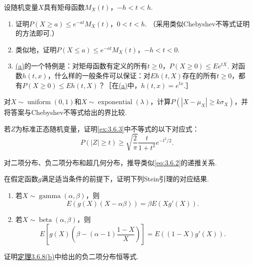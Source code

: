 \begin{exercise}\label{exercise:3.45}
设随机变量$X$具有矩母函数$M_X(t)$，$-h<t<h$.
\begin{enumerate}
\item[(a)]\label{itm:exercise:3.45:a} 证明$P(X\ge a)\le e^{-at}M_X(t)$，$0<t<h$. （采用类似Chebyshev不等式证明的方法即可.）
\item[(b)] 类似地，证明$P(X\le a)\le e^{-at}M_X(t)$，$-h<t<0$.
\item[(c)] \hyperref[itm:exercise:3.45:a]{(a)}的一个特例是：对矩母函数有定义的所有$t\ge0$，$P(X\ge0)\le Ee^{tX}$. 对函数$h(t,x)$，什么样的一般条件可以保证：对$Eh(t,X)$存在的所有$t\ge0$，都有$P(X\ge0)\le Eh(t,X)$？［在\hyperref[itm:exercise:3.45:a]{(a)}中，$h(t,x)=e^{tx}$.］
\end{enumerate}
\end{exercise}
\begin{exercise}\label{exercise:3.46}
对$X\sim\operatorname{uniform}(0,1)$和$X\sim\operatorname{exponential}(\lambda)$，计算$P(|X-\mu_X|\ge k\sigma_X)$，并将答案与Chebyshev不等式给出的界比较.
\end{exercise}
\begin{exercise}\label{exercise:3.47}
若$Z$为标准正态随机变量，证明\autoref{ex:3.6.3}中不等式的以下对应式：
$$P(|Z|\ge t)\ge\sqrt{\frac2\pi}\frac t{1+t^2}e^{-t^2/2}.$$
\end{exercise}
\begin{exercise}\label{exercise:3.48}
对二项分布、负二项分布和超几何分布，推导类似\eqref{eq:3.6.2}的递推关系.
\end{exercise}
\begin{exercise}\label{exercise:3.49}
在假定函数$g$满足适当条件的前提下，证明下列Stein引理的对应结果.
\begin{enumerate}
\item[(a)] 若$X\sim\operatorname{gamma}(\alpha,\beta)$，则
$$E(g(X)(X-\alpha\beta))=\beta E(Xg'(X)).$$
\item[(b)] 若$X\sim\operatorname{beta}(\alpha,\beta)$，则
$$E\left[g(X)\left(\beta-(\alpha-1)\frac{1-X}X\right)\right]=E((1-X)g'(X)).$$
\end{enumerate}
\end{exercise}
\begin{exercise}\label{exercise:3.50}
证明\hyperref[thm:3.6.8]{定理3.6.8(b)}中给出的负二项分布恒等式.
\end{exercise}
